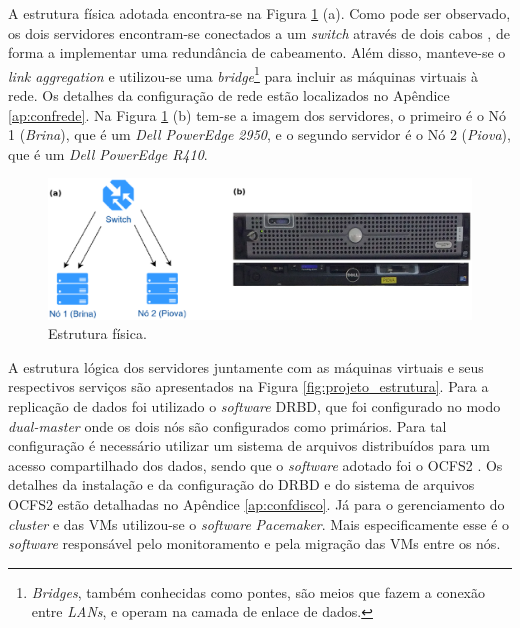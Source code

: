 A estrutura física adotada encontra-se na Figura \ref{fig:projeto_fisico} (a). Como pode ser observado, os dois servidores encontram-se 
conectados a um \textit{switch} através de dois cabos , de forma a implementar uma redundância de cabeamento. Além disso, manteve-se o 
\textit{link aggregation} e utilizou-se uma \textit{bridge}\footnote[1]{\textit{Bridges}, também conhecidas como pontes, são meios que fazem a 
conexão entre \textit{LANs}, e operam na camada de enlace de dados.} para incluir as máquinas virtuais à rede. 
Os detalhes da configuração de rede estão localizados no Apêndice \ref{ap:confrede}.
Na Figura \ref{fig:projeto_fisico} (b) tem-se a imagem dos servidores, o primeiro é o Nó 1 (\textit{Brina}), que é um 
\textit{Dell PowerEdge 2950}, e o segundo servidor é o Nó 2 (\textit{Piova}), que é um \textit{Dell PowerEdge R410}.

\begin{figure}[h!]
 \centering
 \includegraphics[width=430px]{img/projeto_fisico.eps}
 \caption{Estrutura física.}
 \label{fig:projeto_fisico}
\end{figure}

A estrutura lógica dos servidores juntamente com as máquinas virtuais e seus respectivos serviços são apresentados na Figura 
\ref{fig:projeto_estrutura}. Para a replicação de dados foi utilizado o \textit{software} \ac{DRBD}, que foi configurado no modo 
\textit{dual-master} onde os dois nós são configurados como primários. Para tal configuração é necessário utilizar um sistema de arquivos 
distribuídos para um acesso compartilhado dos dados, sendo que o \textit{software} adotado foi o \ac{OCFS2} \cite{ocfs2}. 
Os detalhes da instalação e da configuração do \ac{DRBD} e do sistema de arquivos \ac{OCFS2} estão detalhadas no Apêndice \ref{ap:confdisco}. 
Já para o gerenciamento do \textit{cluster} e das \acp{VM} utilizou-se o \textit{software} \textit{Pacemaker}. 
Mais especificamente esse é o \textit{software} responsável pelo monitoramento e pela migração das \acp{VM} entre os nós.

